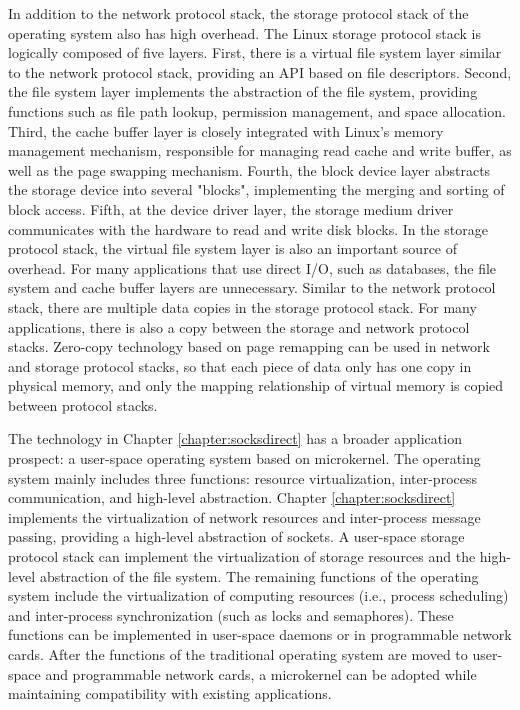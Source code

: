 In addition to the network protocol stack, the storage protocol stack of the operating system also has high overhead.
The Linux storage protocol stack is logically composed of five layers. First, there is a virtual file system layer similar to the network protocol stack, providing an API based on file descriptors.
Second, the file system layer implements the abstraction of the file system, providing functions such as file path lookup, permission management, and space allocation.
Third, the cache buffer layer is closely integrated with Linux's memory management mechanism, responsible for managing read cache and write buffer, as well as the page swapping mechanism.
Fourth, the block device layer abstracts the storage device into several "blocks", implementing the merging and sorting of block access.
Fifth, at the device driver layer, the storage medium driver communicates with the hardware to read and write disk blocks.
In the storage protocol stack, the virtual file system layer is also an important source of overhead. For many applications that use direct I/O, such as databases, the file system and cache buffer layers are unnecessary.
Similar to the network protocol stack, there are multiple data copies in the storage protocol stack. For many applications, there is also a copy between the storage and network protocol stacks. Zero-copy technology based on page remapping can be used in network and storage protocol stacks, so that each piece of data only has one copy in physical memory, and only the mapping relationship of virtual memory is copied between protocol stacks.

The technology in Chapter \ref{chapter:socksdirect} has a broader application prospect: a user-space operating system based on microkernel.
The operating system mainly includes three functions: resource virtualization, inter-process communication, and high-level abstraction.
Chapter \ref{chapter:socksdirect} implements the virtualization of network resources and inter-process message passing, providing a high-level abstraction of sockets.
A user-space storage protocol stack can implement the virtualization of storage resources and the high-level abstraction of the file system.
The remaining functions of the operating system include the virtualization of computing resources (i.e., process scheduling) and inter-process synchronization (such as locks and semaphores).
These functions can be implemented in user-space daemons or in programmable network cards.
After the functions of the traditional operating system are moved to user-space and programmable network cards, a microkernel can be adopted while maintaining compatibility with existing applications.

